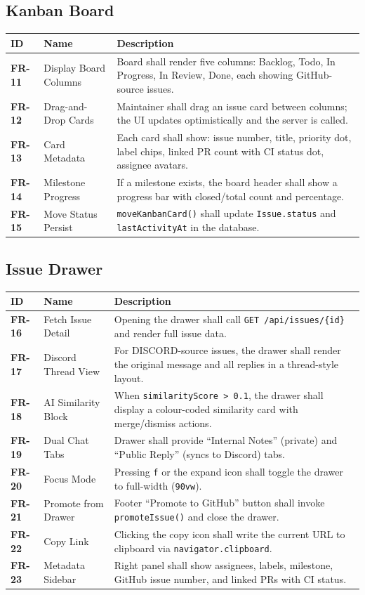 \documentclass[12pt,a4paper]{report}
\begin{document}
\subsection{Kanban Board}

\begin{longtable}{>{\bfseries}p{1.8cm} p{4.5cm} p{6.5cm}}
\toprule
ID & Name & Description \\
\midrule
\endhead
FR-11 & Display Board Columns & Board shall render five columns: Backlog, Todo,
  In Progress, In Review, Done, each showing GitHub-source issues. \\
FR-12 & Drag-and-Drop Cards & Maintainer shall drag an issue card between
  columns; the UI updates optimistically and the server is called. \\
FR-13 & Card Metadata & Each card shall show: issue number, title, priority
  dot, label chips, linked PR count with CI status dot, assignee avatars. \\
FR-14 & Milestone Progress & If a milestone exists, the board header shall show
  a progress bar with closed/total count and percentage. \\
FR-15 & Move Status Persist & \texttt{moveKanbanCard()} shall update
  \texttt{Issue.status} and \texttt{lastActivityAt} in the database. \\
\bottomrule
\end{longtable}

\subsection{Issue Drawer}

\begin{longtable}{>{\bfseries}p{1.8cm} p{4.5cm} p{6.5cm}}
\toprule
ID & Name & Description \\
\midrule
\endhead
FR-16 & Fetch Issue Detail & Opening the drawer shall call
  \texttt{GET /api/issues/\{id\}} and render full issue data. \\
FR-17 & Discord Thread View & For DISCORD-source issues, the drawer shall
  render the original message and all replies in a thread-style layout. \\
FR-18 & AI Similarity Block & When \texttt{similarityScore > 0.1}, the drawer
  shall display a colour-coded similarity card with merge/dismiss actions. \\
FR-19 & Dual Chat Tabs & Drawer shall provide ``Internal Notes'' (private) and
  ``Public Reply'' (syncs to Discord) tabs. \\
FR-20 & Focus Mode & Pressing \texttt{f} or the expand icon shall toggle the
  drawer to full-width (\texttt{90vw}). \\
FR-21 & Promote from Drawer & Footer ``Promote to GitHub'' button shall invoke
  \texttt{promoteIssue()} and close the drawer. \\
FR-22 & Copy Link & Clicking the copy icon shall write the current URL to
  clipboard via \texttt{navigator.clipboard}. \\
FR-23 & Metadata Sidebar & Right panel shall show assignees, labels, milestone,
  GitHub issue number, and linked PRs with CI status. \\
\bottomrule
\end{longtable}
\end{document}
